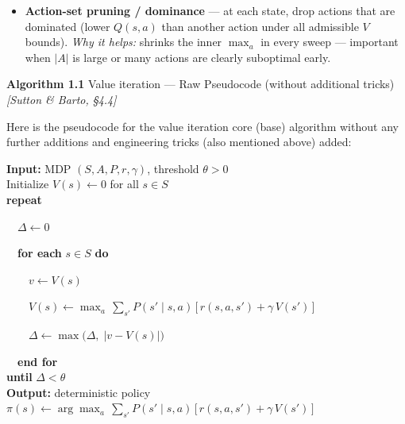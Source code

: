 \documentclass[11pt]{article}
\begin{document}
\begin{itemize}
  \(\mathrm{sp}(V_{k+1}-V_k) < \theta\,(1-\gamma)/\gamma\), where
  \(\mathrm{sp}(x)=\max x-\min x\). \emph{Why it helps:} yields a tight
  \(\varepsilon\)-optimal-\emph{policy} guarantee from the contraction
  bound, so the loop stops as soon as the policy is provably
  near-optimal rather than at an arbitrary max-norm threshold.
\item
  \label{trick-1-1-6}\textbf{Action-set pruning /
  dominance} --- at each state, drop actions that are dominated (lower
  \(Q(s,a)\) than another action under all admissible \(V\) bounds).
  \emph{Why it helps:} shrinks the inner \(\max_a\) in every sweep ---
  important when \(|A|\) is large or many actions are clearly suboptimal
  early.
\end{itemize}

    \label{pseudo-1-1}

    \begin{pseudobox}

\textbf{Algorithm 1.1} Value iteration --- Raw Pseudocode (without
additional tricks) \emph{{[}Sutton \& Barto, §4.4{]}}

\tcbline

Here is the pseudocode for the value iteration core (base) algorithm
without any further additions and engineering tricks (also mentioned
above) added:

\textbf{Input:} MDP \((S, A, P, r, \gamma)\), threshold \(\theta > 0\)\\
Initialize \(V(s) \leftarrow 0\) for all \(s \in S\)\\
\textbf{repeat}\\
\strut ~~\(\Delta \leftarrow 0\)\\
\strut ~~\textbf{for each} \(s \in S\) \textbf{do}\\
\strut ~~~~\(v \leftarrow V(s)\)\\
\strut ~~~~\(V(s) \leftarrow \max_{a}\, \sum_{s'} P(s' \mid s, a)\,\bigl[\, r(s, a, s') + \gamma\, V(s') \,\bigr]\)\\
\strut ~~~~\(\Delta \leftarrow \max\!\bigl(\Delta,\; |v - V(s)|\bigr)\)\\
\strut ~~\textbf{end for}\\
\textbf{until} \(\Delta < \theta\)\\
\textbf{Output:} deterministic policy
\(\pi(s) \leftarrow \arg\max_{a}\, \sum_{s'} P(s' \mid s, a)\,\bigl[\, r(s, a, s') + \gamma\, V(s') \,\bigr]\)

\end{pseudobox}
\end{document}
